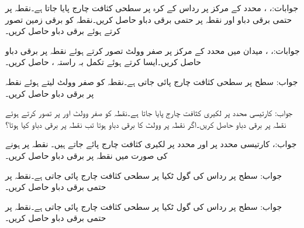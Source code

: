 جوابات:، ، 
محدد کے مرکز پر  رداس کے کرہ پر سطحی کثافت چارج  پایا جاتا ہے۔نقطہ  پر حتمی برقی دباو  اور  نقطہ   پر حتمی برقی دباو  حاصل کریں۔نقطہ  کو برقی زمین تصور کرتے ہوئے برقی دباو  حاصل کریں۔ 

جوابات:، ، 
میدان  میں محدد کے مرکز پر صفر وولٹ تصور کرتے ہوئے نقطہ  پر برقی دباو حاصل کریں۔ایسا کرتے ہوئے تکمل بہ راستہ ،  حاصل کریں۔

جواب:
سطح  پر سطحی کثافت چارج  پائی جاتی ہے۔نقطہ  کو صفر وولٹ لیتے ہوئے  نقطہ  پر برقی دباو  حاصل کریں۔

جواب:
کارتیسی  محدد پر لکیری کثافت چارج  پایا جاتا ہے۔نقطہ  کو صفر وولٹ اور پر تصور کرتے ہوئے نقطہ  پر برقی دباو حاصل کریں۔اگر نقطہ  پر  وولٹ کا برقی دباو ہوتا تب نقطہ  پر برقی دباو کیا ہوتا؟

جواب:، 
کارتیسی  محدد پر  اور  محدد پر  لکیری کثافت چارج پائے جاتے ہیں۔ نقطہ  پر  ہونے کی صورت میں نقطہ  پر برقی دباو حاصل کریں۔

جواب:
 سطح  پر رداس  کی گول ٹکیا  پر سطحی کثافت چارج  پائی جاتی ہے۔نقطہ  پر  حتمی برقی دباو حاصل کریں۔

جواب:
 سطح  پر رداس  کی گول ٹکیا  پر سطحی کثافت چارج  پائی جاتی ہے۔نقطہ  پر  حتمی برقی دباو حاصل کریں۔


